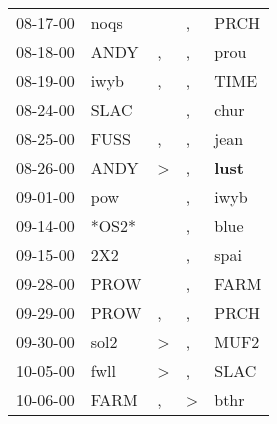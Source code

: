 \begin{supertabular}{p{0.07\textwidth}p{0.06\textwidth}p{0.02\textwidth}p{0.02\textwidth}p{0.06\textwidth}}
          08-17-00\textsuperscript{} &           noqs\textsuperscript{} &                  &                , &           PRCH\textsuperscript{} \\
          08-18-00\textsuperscript{} &           ANDY\textsuperscript{} &                , &                , &           prou\textsuperscript{} \\
          08-19-00\textsuperscript{} &           iwyb\textsuperscript{} &                , &                , &           TIME\textsuperscript{} \\
          08-24-00\textsuperscript{} &           SLAC\textsuperscript{} &                  &                , &           chur\textsuperscript{} \\
          08-25-00\textsuperscript{} &           FUSS\textsuperscript{} &                , &                , &           jean\textsuperscript{} \\
          08-26-00\textsuperscript{} &           ANDY\textsuperscript{} &     \textgreater &                , &  \textbf{lust\textsuperscript{}} \\
          09-01-00\textsuperscript{} &            pow\textsuperscript{} &                  &                , &           iwyb\textsuperscript{} \\
          09-14-00\textsuperscript{} &                            *OS2* &                  &                , &           blue\textsuperscript{} \\
          09-15-00\textsuperscript{} &            2X2\textsuperscript{} &                  &                , &           spai\textsuperscript{} \\
          09-28-00\textsuperscript{} &           PROW\textsuperscript{} &                  &                , &           FARM\textsuperscript{} \\
          09-29-00\textsuperscript{} &           PROW\textsuperscript{} &                , &                , &           PRCH\textsuperscript{} \\
          09-30-00\textsuperscript{} &           sol2\textsuperscript{} &     \textgreater &                , &           MUF2\textsuperscript{} \\
          10-05-00\textsuperscript{} &           fwll\textsuperscript{} &     \textgreater &                , &           SLAC\textsuperscript{} \\
          10-06-00\textsuperscript{} &           FARM\textsuperscript{} &                , &     \textgreater &           bthr\textsuperscript{} \\

\end{supertabular}
